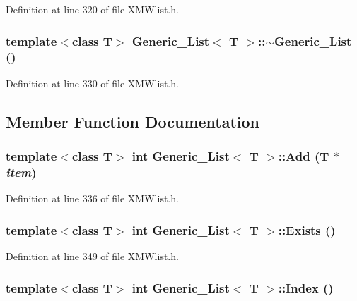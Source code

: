 Definition at line 320 of file XMWlist.h.
\subsubsection{\setlength{\rightskip}{0pt plus 5cm}template$<$class T$>$ Generic\_\-List$<$ T $>$::$\sim$Generic\_\-List ()\hspace{0.3cm}{\tt  [inline]}}\label{classGeneric__List_a1}




Definition at line 330 of file XMWlist.h.

\subsection{Member Function Documentation}
\subsubsection{\setlength{\rightskip}{0pt plus 5cm}template$<$class T$>$ int Generic\_\-List$<$ T $>$::Add (T $\ast$ {\em item})\hspace{0.3cm}{\tt  [inline]}}\label{classGeneric__List_a2}




Definition at line 336 of file XMWlist.h.
\subsubsection{\setlength{\rightskip}{0pt plus 5cm}template$<$class T$>$ int Generic\_\-List$<$ T $>$::Exists ()\hspace{0.3cm}{\tt  [inline]}}\label{classGeneric__List_a4}




Definition at line 349 of file XMWlist.h.
\subsubsection{\setlength{\rightskip}{0pt plus 5cm}template$<$class T$>$ int Generic\_\-List$<$ T $>$::Index ()\hspace{0.3cm}{\tt  [inline]}}\label{classGeneric__List_a6}




